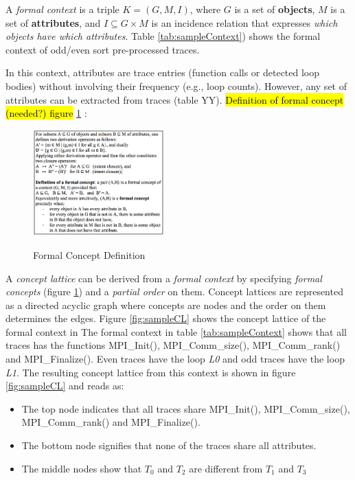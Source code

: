 A \textit{formal context} is a triple $K = (G, M, I)$, where $G$ is a set of \textbf{objects}, $M$ is a set of \textbf{attributes}, and $I \subseteq G \times M$ is an incidence relation that expresses \textit{which objects have which attributes}. Table \ref{tab:sampleContext}) shows the formal context of odd/even sort pre-processed traces. 

%
In this context, attributes are trace entries (function calls or detected loop bodies) without involving their frequency (e.g., loop counts). However, any set of attributes can be extracted from traces (table YY).
%
\hl{Definition of formal concept (needed?) figure }\ref{fig:formalConceptDefinition} :

\begin{figure}[]
\centering
\caption{Formal Concept Definition}
\includegraphics[width=0.45\textwidth]{figs/formalConceptDefinition.png}
\label{fig:formalConceptDefinition}
\end{figure}

A \textit{concept lattice} can be derived from a \textit{formal context} by specifying \textit{formal concepts} (figure \ref{fig:formalConceptDefinition}) and a \textit{partial order} on them. Concept lattices are represented as a directed acyclic graph where concepts are nodes and the order on them determines the edges.
%
Figure \ref{fig:sampleCL} shows the concept lattice of the formal context in 
%
The formal context in table \ref{tab:sampleContext} shows that all traces has the functions MPI\_Init(), MPI\_Comm\_size(), MPI\_Comm\_rank() and MPI\_Finalize(). Even traces have the loop \textit{L0} and odd traces have the loop \textit{L1}. The resulting concept lattice from this context is shown in figure \ref{fig:sampleCL} and reads as:

\begin{itemize}
	\item The top node indicates that all traces share MPI\_Init(), MPI\_Comm\_size(), MPI\_Comm\_rank() and MPI\_Finalize().
	\item The bottom node signifies that none of the traces share all attributes. 
	\item The middle nodes show that $T_0$ and $T_2$ are different from  $T_1$ and $T_3$
\end{itemize}

